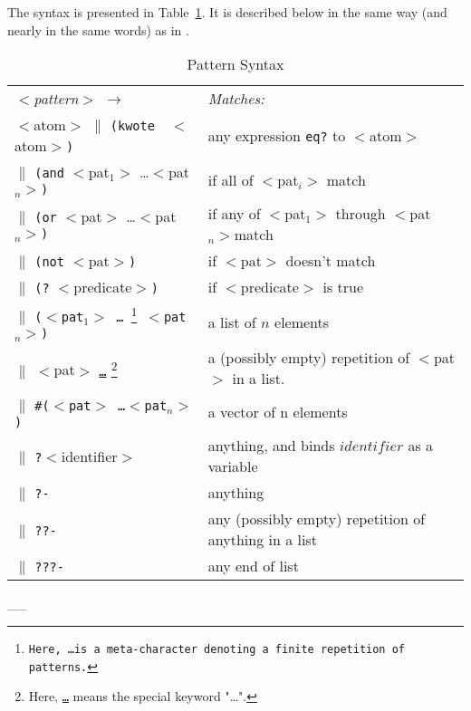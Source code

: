 The syntax is presented in Table~\ref{PatternLanguage}. It is
described below in the same way (and nearly in the same words) as in
\cite{Wright-Duba-93}.

\begin{table} %


\begin{small}

\begin{tabular}{ll}

{\em $<$pattern$>$ $\longrightarrow$} & {\em Matches:} \\

$<$atom$>$ $\|$ {\tt (kwote { }}$<$atom$>${\tt )} 
        & any expression {\tt eq?} to $<$atom$>$\\
$\|$ {\tt (and} $<$pat$_1>$ \ldots $<$pat$_n>${\tt )} 
        & if all of $<$pat$_i>$ match \\
$\|$ {\tt (or} $<$pat$>$ \ldots $<$pat$_n>${\tt )} 
        & if any of $<$pat$_1>$ through $<$pat$_n> $match \\
$\|$ {\tt (not} $<$pat$>${\tt )} 
        & if $<$pat$>$ doesn't match \\
$\|$ {\tt (?} $<$predicate$>${\tt )} 
        & if  $<$predicate$>$ is true\\
$\|$ {\tt ($<$pat$_1>$ \ldots 
        \footnote{Here, \ldots is a meta-character denoting a finite repetition of patterns. }
$<$pat$_n>$)}  
    & a list of $n$ elements \\
$\|$ $<$pat$>$ {\tt \underline{\ldots}}
        \footnote{Here, {\tt \underline{\ldots}} means the special keyword "\ldots". }
     & a (possibly empty) repetition of $<$pat$>$ in a list.  \\
$\|$ {\tt \#($<$pat$>$ \ldots $<$pat$_n>$)}  
     & a vector of n elements \\
$\|$ {\tt ?}$<$identifier$>$ & anything, and binds $identifier$ as a variable \\
$\|$ \verb#?-# & anything \\
$\|$ \verb#??-# & any (possibly empty) repetition of anything in a list \\
$\|$ \verb#???-# & any end of list \\

\end{tabular}

\end{small}

\caption{Pattern Syntax}
\label{PatternLanguage}
\_\hrulefill\_
\end{table}

